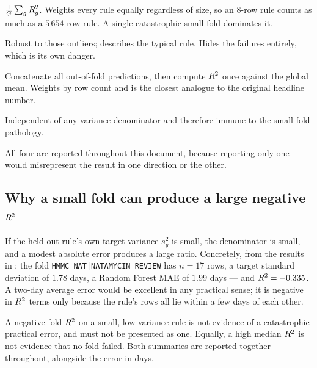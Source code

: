 \begin{description}[leftmargin=1.6em, style=nextline, font=\bfseries\color{dgreen}]
\item[Mean fold $\rsq$] $\frac{1}{G}\sum_g R^2_g$. Weights every rule
  equally regardless of size, so an $8$-row rule counts as much as a
  $5\,654$-row rule. A single catastrophic small fold dominates it.
\item[Median fold $\rsq$] Robust to those outliers; describes the typical
  rule. Hides the failures entirely, which is its own danger.
\item[Pooled out-of-fold $\rsq$] Concatenate all out-of-fold predictions,
  then compute $\rsq$ once against the global mean. Weights by row count
  and is the closest analogue to the original headline number.
\item[MAE in days] Independent of any variance denominator and therefore
  immune to the small-fold pathology.
\end{description}

All four are reported throughout this document, because reporting only one
would misrepresent the result in one direction or the other.

\subsection{Why a small fold can produce a large negative $\rsq$}

If the held-out rule's own target variance $s_y^2$ is small, the
denominator is small, and a modest absolute error produces a large ratio.
Concretely, from the results in : the fold
\texttt{HMMC\_NAT|NATAMYCIN\_REVIEW} has $n = 17$ rows, a target standard
deviation of $1.78$ days, a Random Forest MAE of $1.99$ days --- and
$R^2 = -0.335$. A two-day average error would be excellent in any
practical sense; it is negative in $\rsq$ terms only because the rule's
rows all lie within a few days of each other.

\begin{findingbox}[title=Reporting implication]
A negative fold $\rsq$ on a small, low-variance rule is not evidence of a
catastrophic practical error, and must not be presented as one. Equally, a
high median $\rsq$ is not evidence that no fold failed. Both summaries are
reported together throughout, alongside the error in days.
\end{findingbox}


